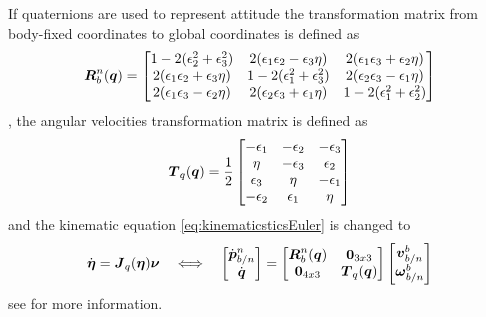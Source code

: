 If quaternions are used to represent attitude the transformation matrix from body-fixed coordinates to global coordinates is defined as 
\begin{equation}
\boldsymbol{R}^n_b(\boldsymbol{q}) = \begin{bmatrix}
  1 - 2(\epsilon_2^2 + \epsilon_3^2) & 2(\epsilon_1\epsilon_2 - \epsilon_3\eta)   & 2(\epsilon_1\epsilon_3 + \epsilon_2\eta) \\
     2(\epsilon_1\epsilon_2 + \epsilon_3\eta) &  1-2(\epsilon_1^2 + \epsilon_3^2) & 2(\epsilon_2\epsilon_3-\epsilon_1\eta)    \\
     2(\epsilon_1\epsilon_3 - \epsilon_2\eta) &  2(\epsilon_2\epsilon_3 + \epsilon_1\eta)  & 1-2(\epsilon_1^2 + \epsilon_2^2) \\
\end{bmatrix}
\end{equation}, the angular velocities transformation matrix is defined as
\begin{equation} \label{eq:Tquat}
\boldsymbol{T}_q(\boldsymbol{q}) = \frac{1}{2}
\begin{bmatrix}
-\epsilon_1  & -\epsilon_2  & -\epsilon_3 \\
\eta   & -\epsilon_3 & \epsilon_2 \\
\epsilon_3 & \eta    &  -\epsilon_1 \\
-\epsilon_2 & \epsilon_1    & \eta \\
\end{bmatrix}
\end{equation}
and the kinematic equation \eqref{eq:kinematicsticsEuler} is changed to 
\begin{equation}
\dot{\boldsymbol{\eta}} = \boldsymbol{J}_q(\boldsymbol{\eta})\boldsymbol{\nu}
\quad\Longleftrightarrow\quad
\begin{bmatrix}
\dot{\boldsymbol{p}}^n_{b/n} \\
\dot{\boldsymbol{q}}
\end{bmatrix}
=
\begin{bmatrix}
\boldsymbol{R}^n_b(\boldsymbol{q}) & \boldsymbol{0}_{3x3} \\
\boldsymbol{0}_{4x3} & \boldsymbol{T}_q(\boldsymbol{q})
\end{bmatrix}
\begin{bmatrix}
\boldsymbol{v}^b_{b/n} \\
\boldsymbol{\omega}^b_{b/n}
\end{bmatrix}
\end{equation}
see \citet[Ch. 2]{fossen2011} for more information. 
